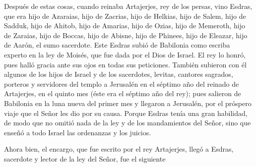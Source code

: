  Después de estas cosas, cuando reinaba Artajerjes, rey de
los persas, vino Esdras, que era hijo de Azaraias, hijo de Zacrias, hijo
de Helkias, hijo de Salem,  hijo de Sadduk, hijo de
Ahitob, hijo de Amarias, hijo de Ozias, hijo de Memeroth, hijo de
Zaraias, hijo de Boccas, hijo de Abisne, hijo de Phinees, hijo de
Eleazar, hijo de Aarón, el sumo sacerdote.  Este Esdras
subió de Babilonia como escriba experto en la ley de Moisés, que fue
dada por el Dios de Israel.  El rey lo honró, pues halló
gracia ante sus ojos en todas sus peticiones.  También
subieron con él algunos de los hijos de Israel y de los sacerdotes,
levitas, cantores sagrados, porteros y servidores del templo a Jerusalén
 en el séptimo año del reinado de Artajerjes, en el quinto
mes (éste era el séptimo año del rey); pues salieron de Babilonia en la
luna nueva del primer mes y llegaron a Jerusalén, por el próspero viaje
que el Señor les dio por su causa.  Porque Esdras tenía
una gran habilidad, de modo que no omitió nada de la ley y de los
mandamientos del Señor, sino que enseñó a todo Israel las ordenanzas y
los juicios.

 Ahora bien, el encargo, que fue escrito por el rey
Artajerjes, llegó a Esdras, sacerdote y lector de la ley del Señor, fue
el siguiente

